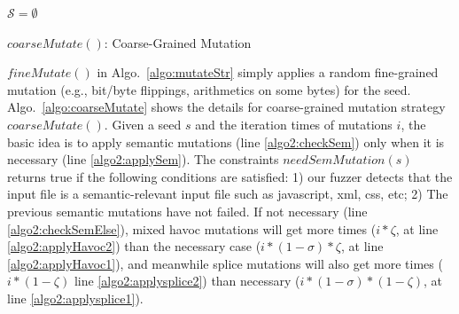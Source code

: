 \begin{algorithm}[t]
	\small	
	\BlankLine
	
	$\mathcal{S} = \emptyset$\;	
	\caption{$coarseMutate()$: Coarse-Grained Mutation}
	\label{algo:coarseMutate}
\end{algorithm}
 
$fineMutate()$ in  Algo.~\ref{algo:mutateStr}  simply  applies a random fine-grained mutation (e.g., bit/byte flippings, arithmetics  on some bytes) for the seed. Algo.~\ref{algo:coarseMutate} shows the details for coarse-grained mutation strategy  $coarseMutate()$. Given a seed $s$ and the iteration times of mutations $i$, the basic idea is to apply semantic mutations (line \ref{algo2:checkSem}) only  when it is  necessary (line \ref{algo2:applySem}). The constraints $needSemMutation(s)$ returns true if the following conditions are satisfied: 1) our fuzzer detects that the input file is  a semantic-relevant input file such as javascript, xml, css, etc; 2) The previous semantic mutations have not failed. If not necessary (line \ref{algo2:checkSemElse}), mixed havoc mutations will get more times ($i * \zeta$, at line \ref{algo2:applyHavoc2}) than the necessary case ($i * (1-\sigma) * \zeta$, at line \ref{algo2:applyHavoc1}), and meanwhile splice mutations will also get more times ($ i * (1-\zeta)$ line \ref{algo2:applysplice2}) than necessary ($i * (1-\sigma) * (1-\zeta)$, at line \ref{algo2:applysplice1}).

